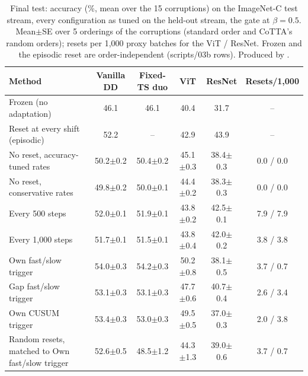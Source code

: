 \begin{table}[t]
  \centering\small
  \begin{tabular}{@{}lccccc@{}}
    \toprule
    Method & Vanilla DD & Fixed-TS duo & ViT & ResNet & Resets/1,000 \\
    \midrule
    Frozen (no adaptation) & 46.1 & 46.1 & 40.4 & 31.7 & -- \\
    Reset at every shift (episodic) & 52.2 & -- & 42.9 & 43.9 & -- \\
    \midrule
    No reset, accuracy-tuned rates & 50.2$\pm$0.2 & 50.4$\pm$0.2 & 45.1$\pm$0.3 & 38.4$\pm$0.3 & 0.0 / 0.0 \\
    No reset, conservative rates & 49.8$\pm$0.2 & 50.0$\pm$0.1 & 44.4$\pm$0.2 & 38.3$\pm$0.3 & 0.0 / 0.0 \\
    \midrule
    Every 500 steps & 52.0$\pm$0.1 & 51.9$\pm$0.1 & 43.8$\pm$0.2 & 42.5$\pm$0.1 & 7.9 / 7.9 \\
    Every 1,000 steps & 51.7$\pm$0.1 & 51.5$\pm$0.1 & 43.8$\pm$0.4 & 42.0$\pm$0.2 & 3.8 / 3.8 \\
    \midrule
    Own fast/slow trigger & 54.0$\pm$0.3 & 54.2$\pm$0.3 & 50.2$\pm$0.8 & 38.1$\pm$0.5 & 3.7 / 0.7 \\
    Gap fast/slow trigger & 53.1$\pm$0.3 & 53.1$\pm$0.3 & 47.7$\pm$0.6 & 40.7$\pm$0.4 & 2.6 / 3.4 \\
    Own CUSUM trigger & 53.4$\pm$0.3 & 53.0$\pm$0.3 & 49.5$\pm$0.5 & 37.0$\pm$0.3 & 2.0 / 3.8 \\
    \midrule
    Random resets, matched to Own fast/slow trigger & 52.6$\pm$0.5 & 48.5$\pm$1.2 & 44.3$\pm$1.3 & 39.0$\pm$0.6 & 3.7 / 0.7 \\
    \bottomrule
  \end{tabular}
  \caption{Final test: accuracy (\%, mean over the 15 corruptions) on the ImageNet-C test stream, every configuration as tuned on the held-out stream, the gate at $\beta=0.5$. Mean$\pm$SE over 5 orderings of the corruptions (standard order and CoTTA's random orders); resets per 1,000 proxy batches for the ViT / ResNet. Frozen and the episodic reset are order-independent (scripts/03b rows). Produced by .}
  \label{tab:final_test}
\end{table}

